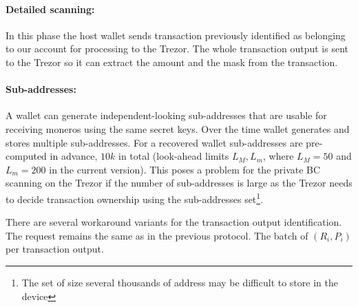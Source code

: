 \documentclass[]{article}
\begin{document}
\paragraph{Detailed scanning:} In this phase the host wallet sends transaction previously identified as belonging to our account for processing to the Trezor. The whole transaction output is sent to the Trezor so it can extract the amount and the mask from the transaction.

\paragraph{Sub-addresses:}
A wallet can generate independent-looking sub-addresses that are usable for receiving moneros using the same secret keys. Over the time wallet generates and stores multiple sub-addresses. 
For a recovered wallet sub-addresses are pre-computed in advance, $10k$ in total (look-ahead limits $L_M, L_m$, where $L_M=50$ and $L_m=200$ in the current version).
This poses a problem for the private BC scanning on the Trezor if the number of sub-addresses is large as the Trezor needs to decide transaction ownership using the sub-addresses set\footnote{The set of size several thousands of address may be difficult to store in the device}.

There are several workaround variants for the transaction output identification. The request remains the same as in the previous protocol. The batch of $(R_i, P_i)$ per transaction output.
\end{document}
